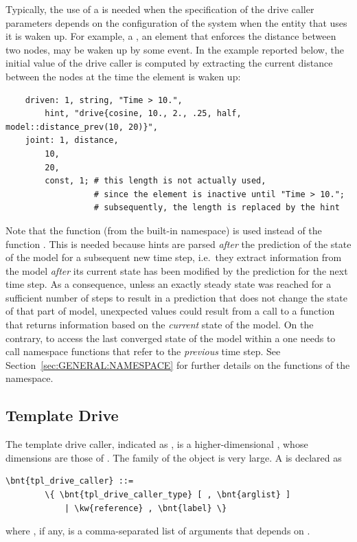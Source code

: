 Typically, the use of a  is needed when the specification of the
drive caller parameters depends on the configuration of the system when the
entity that uses it is waken up.
For example, a , an element that enforces the distance
between two nodes, may be waken up by some event.
In the example reported below, the initial value of the  drive caller
is computed by extracting the current distance between the nodes at the time
the element is waken up:
\begin{verbatim}
    driven: 1, string, "Time > 10.",
        hint, "drive{cosine, 10., 2., .25, half, model::distance_prev(10, 20)}",
    joint: 1, distance,
        10,
        20,
        const, 1; # this length is not actually used,
                  # since the element is inactive until "Time > 10.";
                  # subsequently, the length is replaced by the hint
\end{verbatim}
Note that the function 
(from the built-in  namespace)
is used instead of the function .
This is needed because hints are parsed \emph{after} the prediction
of the state of the model for a subsequent new time step,
i.e.\ they extract information from the model
\emph{after} its current state has been modified by the prediction
for the next time step.
As a consequence, unless an exactly steady state was reached
for a sufficient number of steps to result in a prediction
that does not change the state of that part of model,
unexpected values could result from a call to a function that returns
information based on the \emph{current} state of the model.
On the contrary, to access the last converged state of the model
within a  one needs to call  namespace functions
that refer to the \emph{previous} time step.
See Section~\ref{sec:GENERAL:NAMESPACE} for further details
on the functions of the  namespace.



\subsection{Template Drive}\label{sec:TplDriveCaller}
The template drive caller,
indicated as , is a higher-dimensional ,
whose dimensions are those of .
The family of the  object is very large.
A  is declared as
\begin{Verbatim}[commandchars=\\\{\}]
    \bnt{tpl_drive_caller} ::=
        \{ \bnt{tpl_drive_caller_type} [ , \bnt{arglist} ]
            | \kw{reference} , \bnt{label} \}
\end{Verbatim}    
where , if any, is a comma-separated list of arguments
that depends on .

